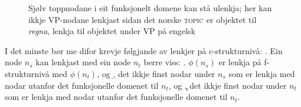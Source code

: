 \documentclass[12pt,a4paper,oneside,draft]{report}
\newcommand{\F}[2]{\textsc{#1}\ensuremath{_{#2}}}
\newcommand{\TOPIC}{\F{topic}{}}
\newcommand{\proj}[2]{\begin{tabular}{c}\footnotesize{#1}\\\normalsize{#2}\end{tabular}}
\newcommand{\ua}{\ensuremath{\uparrow}}
\newcommand{\da}{\ensuremath{\downarrow}}
\begin{document}
  \begin{figure}[htp]
  \centering
     \caption{Sjølv toppnodane i eit funksjonelt domene kan stå
     ulenkja; her kan ikkje VP-nodane lenkjast sidan det norske
     \TOPIC{} er objektet til \emph{regna}, lenkja til objektet under
     VP på engelsk}
     \label{fig:ikkje-c-lenkje-toppnode}
    \end{figure}

I det minste bør me difor krevje følgjande av lenkjer på c-strukturnivå:
\ex.\label{krav:c-tentativt} Ein node $n_s$ kan lenkjast med ein node $n_t$ berre viss:
\a. $\phi(n_s)$ er lenkja på f-strukturnivå med $\phi(n_t)$, og
\b. det ikkje finst nodar under $n_s$ som er lenkja med nodar utanfor det funksjonelle domenet
    til $n_t$, og 
\c. det ikkje finst nodar under $n_t$ som er lenkja med nodar utanfor det funksjonelle domenet
    til $n_t$.
\end{document}
